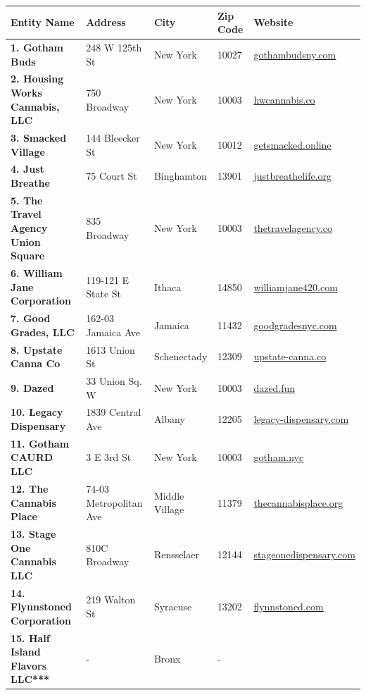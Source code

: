 \documentclass[
  letterpaper,
]{book}
\begin{document}
\begin{longtable}[]{@{}lllll@{}}
\toprule\noalign{}
\textbf{Entity Name} & Address & City & Zip Code & Website \\
\midrule\noalign{}
\endhead
\bottomrule\noalign{}
\endlastfoot
\textbf{1. Gotham Buds} & 248 W 125th St & New York & 10027 &
\href{https://gothambudsny.com}{\ul{gothambudsny.com}} \\
\textbf{2. Housing Works Cannabis, LLC} & 750 Broadway & New York &
10003 & \href{https://hwcannabis.co/}{hwcannabis.co} \\
\textbf{3. Smacked Village} & 144 Bleecker St & New York & 10012 &
\href{https://getsmacked.online/}{getsmacked.online} \\
\textbf{4. Just Breathe} & 75 Court St & Binghamton & 13901 &
\href{https://justbreathelife.org/}{justbreathelife.org} \\
\textbf{5. The Travel Agency Union Square} & 835 Broadway & New York &
10003 & \href{https://www.thetravelagency.co}{thetravelagency.co} \\
\textbf{6. William Jane Corporation} & 119-121 E State St & Ithaca &
14850 & \href{https://williamjane420.com/}{williamjane420.com} \\
\textbf{7. Good Grades, LLC} & 162-03 Jamaica Ave & Jamaica & 11432 &
\href{https://www.goodgradesnyc.com/}{goodgradesnyc.com} \\
\textbf{8. Upstate Canna Co} & 1613 Union St & Schenectady & 12309 &
\href{https://upstate-canna.co/}{upstate-canna.co} \\
\textbf{9. Dazed} & 33 Union Sq. W & New York & 10003 &
\href{https://dazed.fun}{dazed.fun} \\
\textbf{10. Legacy Dispensary} & 1839 Central Ave & Albany & 12205 &
\href{https://legacy-dispensary.com/pickup-menu/}{legacy-dispensary.com} \\
\textbf{11. Gotham CAURD LLC} & 3 E 3rd St & New York & 10003 &
\href{https://gotham.nyc/}{gotham.nyc} \\
\textbf{12. The Cannabis Place} & 74-03 Metropolitan Ave & Middle
Village & 11379 &
\href{https://thecannabisplace.org}{thecannabisplace.org} \\
\textbf{13. Stage One Cannabis LLC} & 810C Broadway & Rensselaer & 12144
& \href{https://stageonedispensary.com/}{stageonedispensary.com} \\
\textbf{14. Flynnstoned Corporation} & 219 Walton St & Syracuse & 13202
& \href{https://flynnstoned.com/}{flynnstoned.com} \\
\textbf{15. Half Island Flavors LLC***} & - & Bronx & - &

\end{longtable}
\end{document}
